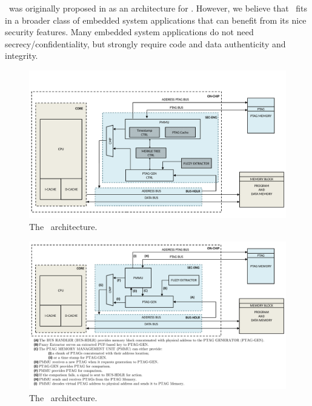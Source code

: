 \cshia~was originally proposed in \cite{Hoffman2015} as an architecture for \iot. However, we believe that \cshia~fits in a broader class of embedded system applications that can benefit from its nice security features. Many embedded system applications do not need secrecy\slash{}confidentiality, but strongly require code and data authenticity and integrity. 
\begin{figure}[H]
    \centering
    \includegraphics[width=\textwidth]{figures/pdf/CSHIA_detailed_caio_expansion.pdf}
    \caption{The \cshia~architecture.}
\end{figure}
\begin{figure}[!ht]
    \centering
    \includegraphics[width=\textwidth]{figures/pdf/cshia.pdf}
    \caption{The \cshia~architecture.}
    \label{fig:cshia}
\end{figure}

